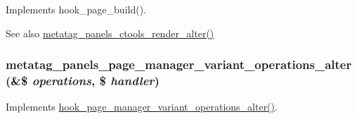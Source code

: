 \label{metatag__panels_8module_aedd357c1991b0fcabfbaeed6f37ab2fe}
Implements hook\_\-page\_\-build().

\begin{DoxySeeAlso}{See also}
\hyperlink{metatag__panels_8module_a32cbb441f027447babe1a3a95999ebc8}{metatag\_\-panels\_\-ctools\_\-render\_\-alter()} 
\end{DoxySeeAlso}
\hypertarget{metatag__panels_8module_ac76e277f850f74fee4cf1f966660a151}{
\subsubsection[{metatag\_\-panels\_\-page\_\-manager\_\-variant\_\-operations\_\-alter}]{\setlength{\rightskip}{0pt plus 5cm}metatag\_\-panels\_\-page\_\-manager\_\-variant\_\-operations\_\-alter (\&\$ {\em operations}, \/  \$ {\em handler})}}
\label{metatag__panels_8module_ac76e277f850f74fee4cf1f966660a151}
Implements \hyperlink{group__hooks_gaf5d4ce054cae22b3bdca52011c6e8fbc}{hook\_\-page\_\-manager\_\-variant\_\-operations\_\-alter()}. 